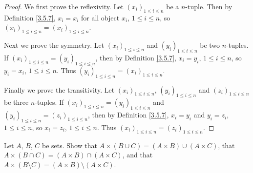 \begin{proof}
We first prove the reflexivity.
Let \((x_i)_{1 \leq i \leq n}\) be a \(n\)-tuple.
Then by Definition \ref{3.5.7}, \(x_i = x_i\) for all object \(x_i\), \(1 \leq i \leq n\), so \((x_i)_{1 \leq i \leq n} = (x_i)_{1 \leq i \leq n}\).

Next we prove the symmetry.
Let \((x_i)_{1 \leq i \leq n}\) and \((y_i)_{1 \leq i \leq n}\) be two \(n\)-tuples.
If \((x_i)_{1 \leq i \leq n} = (y_i)_{1 \leq i \leq n}\), then by Definition \ref{3.5.7}, \(x_i = y_i\), \(1 \leq i \leq n\), so \(y_i = x_i\), \(1 \leq i \leq n\).
Thus \((y_i)_{1 \leq i \leq n} = (x_i)_{1 \leq i \leq n}\).

Finally we prove the transitivity.
Let \((x_i)_{1 \leq i \leq n}\), \((y_i)_{1 \leq i \leq n}\) and \((z_i)_{1 \leq i \leq n}\) be three \(n\)-tuples.
If \((x_i)_{1 \leq i \leq n} = (y_i)_{1 \leq i \leq n}\) and \((y_i)_{1 \leq i \leq n} = (z_i)_{1 \leq i \leq n}\), then by Definition \ref{3.5.7}, \(x_i = y_i\) and \(y_i = z_i\), \(1 \leq i \leq n\), so \(x_i = z_i\), \(1 \leq i \leq n\).
Thus \((x_i)_{1 \leq i \leq n} = (z_i)_{1 \leq i \leq n}\).
\end{proof}

\begin{exercise}\label{ex 3.5.4}
Let \(A\), \(B\), \(C\) be sets.
Show that \(A \times (B \cup C) = (A \times B) \cup (A \times C)\), that \(A \times (B \cap C) = (A \times B) \cap (A \times C)\), and that \(A \times (B \setminus C) = (A \times B) \setminus (A \times C)\).
\end{exercise}

